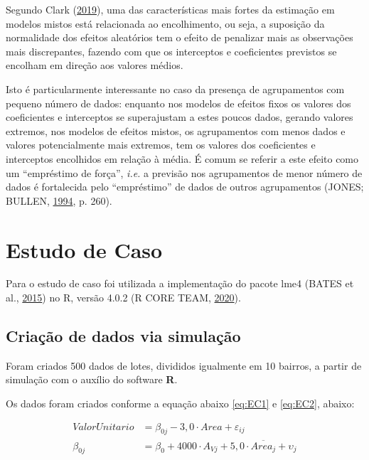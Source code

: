 \documentclass[
  a4paper, 11pt]{article}
\newcommand{\pkg}[1]{{\normalfont\fontseries{b}\selectfont #1}}
\let\proglang=\textsf
\begin{document}
Segundo Clark (\protect\hyperlink{ref-clark2019shrinkage}{2019}), uma
das características mais fortes da estimação em modelos mistos está
relacionada ao encolhimento, ou seja, a suposição da normalidade dos
efeitos aleatórios tem o efeito de penalizar mais as observações mais
discrepantes, fazendo com que os interceptos e coeficientes previstos se
encolham em direção aos valores médios.

Isto é particularmente interessante no caso da presença de agrupamentos
com pequeno número de dados: enquanto nos modelos de efeitos fixos os
valores dos coeficientes e interceptos se superajustam a estes poucos
dados, gerando valores extremos, nos modelos de efeitos mistos, os
agrupamentos com menos dados e valores potencialmente mais extremos, tem
os valores dos coeficientes e interceptos encolhidos em relação à média.
É comum se referir a este efeito como um ``empréstimo de força'',
\emph{i.e.} a previsão nos agrupamentos de menor número de dados é
fortalecida pelo ``empréstimo'' de dados de outros agrupamentos (JONES;
BULLEN, \protect\hyperlink{ref-jones1994}{1994}, p. 260).

\hypertarget{estudo-de-caso}{%
\section{Estudo de Caso}\label{estudo-de-caso}}

Para o estudo de caso foi utilizada a implementação do pacote \pkg{lme4}
(BATES et al., \protect\hyperlink{ref-Bates}{2015}) no \proglang{R},
versão 4.0.2 (R CORE TEAM, \protect\hyperlink{ref-R}{2020}).

\hypertarget{criauxe7uxe3o-de-dados-via-simulauxe7uxe3o}{%
\subsection{Criação de dados via
simulação}\label{criauxe7uxe3o-de-dados-via-simulauxe7uxe3o}}

Foram criados 500 dados de lotes, divididos igualmente em 10 bairros, a
partir de simulação com o auxílio do software \textbf{R}.

Os dados foram criados conforme a equação abaixo \ref{eq:EC1} e
\ref{eq:EC2}, abaixo:

\begin{align}
ValorUnitario &= \beta_{0j} - 3,0 \cdot Area + \varepsilon_{ij}  \label{eq:EC1}\\
\beta_{0j} &= \beta_0 + 4000 \cdot A_{Vj} + 5,0 \cdot \overline{Area_j} + \upsilon_j \label{eq:EC2}
\end{align}
\end{document}
